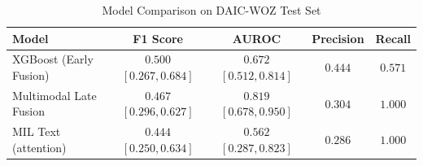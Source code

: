 \begin{table}[htbp]
\centering
\caption{Model Comparison on DAIC-WOZ Test Set}
\label{tab:model_comparison}
\begin{tabular}{lcccc}
\toprule
Model & F1 Score & AUROC & Precision & Recall \\
\midrule
XGBoost (Early Fusion) & $0.500$ $[0.267, 0.684]$ & $0.672$ $[0.512, 0.814]$ & $0.444$ & $0.571$ \\
Multimodal Late Fusion & $0.467$ $[0.296, 0.627]$ & $0.819$ $[0.678, 0.950]$ & $0.304$ & $1.000$ \\
MIL Text (attention) & $0.444$ $[0.250, 0.634]$ & $0.562$ $[0.287, 0.823]$ & $0.286$ & $1.000$ \\
\bottomrule
\end{tabular}
\end{table}